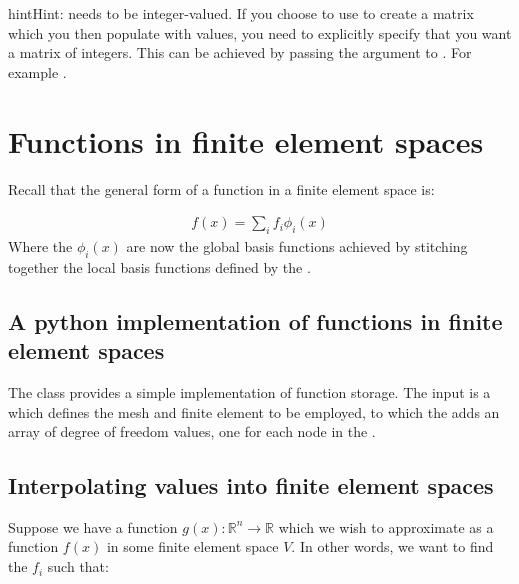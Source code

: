 \documentclass{book}
\begin{document}
\begin{sphinxadmonition}{hint}{Hint:}
 needs to
be integer-valued. If you choose to use 
to create a matrix which you then populate with values, you
need to explicitly specify that you want a matrix of
integers. This can be achieved by passing the  argument
to . For example .
\end{sphinxadmonition}


\chapter{Functions in finite element spaces}
\label{\detokenize{5_functions::doc}}\label{\detokenize{5_functions:functions-in-finite-element-spaces}}
Recall that the general form of a function in a finite element space is:

\label{\detokenize{5_functions:equation-function}}\begin{equation}\label{equation:5_functions:function}
\begin{split}f(x) = \sum_i f_i \phi_i(x)\end{split}
\end{equation}
Where the \(\phi_i(x)\) are now the global basis functions achieved by
stitching together the local basis functions defined by the
{\hyperref[\detokenize{2_finite_elements:secfinitelement}]{}}.


\section{A python implementation of functions in finite element spaces}
\label{\detokenize{5_functions:a-python-implementation-of-functions-in-finite-element-spaces}}
The  class provides a
simple implementation of function storage. The input is a
 which defines the
mesh and finite element to be employed, to which the
 adds an array of degree of
freedom values, one for each node in the
.


\section{Interpolating values into finite element spaces}
\label{\detokenize{5_functions:interpolating-values-into-finite-element-spaces}}
Suppose we have a function \(g(x): \mathbb{R}^n \rightarrow \mathbb{R}\)
which we wish to approximate as a function \(f(x)\) in some finite
element space \(V\). In other words, we want to find the \(f_i\) such that:
\end{document}
